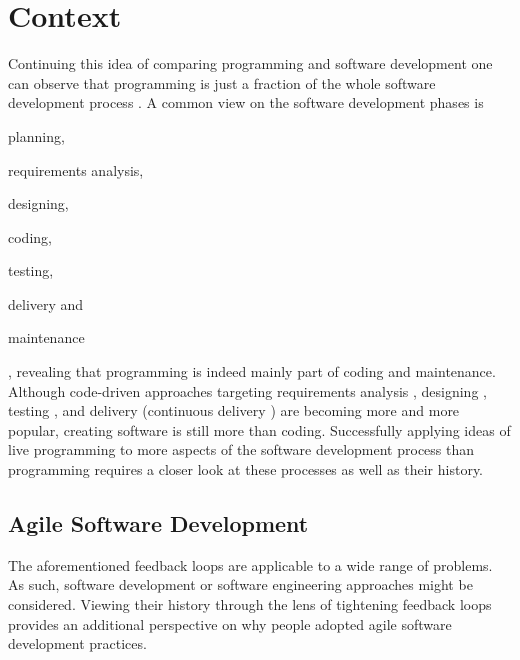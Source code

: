 \section{Context}
\label{sec:context}
Continuing this idea of comparing programming and software development one can observe that programming is just a fraction of the whole software development process \cite{yang_phase_2008}.
A common view on the software development phases is \begin{enumerate*}[label=(\roman*)]
\item planning,
\item requirements analysis,
\item designing,
\item coding,
\item testing,
\item delivery and
\item maintenance
\end{enumerate*},
revealing that programming is indeed mainly part of coding and maintenance.
Although code-driven approaches targeting requirements analysis \cite{sheldon_software_2000}, designing \cite{pimentel_requirements_2014}, testing \cite{beck_test-driven_2003}, and delivery (continuous delivery \cite{chen_continuous_2015}) are becoming more and more popular, creating software is still more than coding.
Successfully applying ideas of live programming to more aspects of the software development process than programming requires a closer look at these processes as well as their history.


\subsection{Agile Software Development}
\label{sec:agile-movement}
The aforementioned feedback loops are applicable to a wide range of problems.
As such, software development or software engineering approaches might be considered.
Viewing their history through the lens of tightening feedback loops provides an additional perspective on why people adopted agile software development practices.


